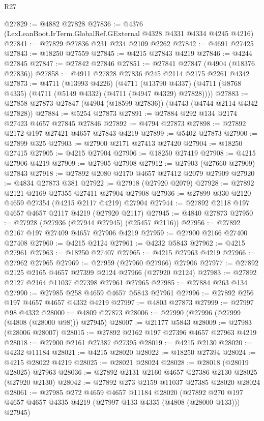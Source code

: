 \begin{lexlean}{R27}
\begin{coremodule}
@27829 := @4882 @27828
@27836 := @4376 (LexLeanBoot.IrTerm.GlobalRef.GExternal @4328 @4331 @4334 @4245 @4216)
@27841 := @27829 @27836 @231 @234 @2109 @2262
@27842 := @4691 @27425
@27843 := @18250 @27559
@27845 := @4215 @27843 @4219
@27846 := @4244 @27845
@27847 := @27842 @27846
@27851 := @27841 @27847 (@4904 (@18376 @27836))
@27858 := @4911 @27828 @27836 @245 @2114 @2175 @2261 @4342
@27873 := @4711
    (@13993 @4226)
    (@4711 (@13790 @4337) (@4711 (@8768 @4335) (@4711 (@5149 @4332) (@4711 (@4947 @4329) @27828))))
@27883 := @27858 @27873 @27847 (@4904 (@18599 @27836)) (@4743 (@4744 @2114 @4342 @27828))
@27884 := @5254 @27873
@27891 := @27884 @292 @134 @2174 @27423 @4657 @27845 @27846
@27892 := @4794 @27873
@27898 := @27892 @2172 @197 @27421 @4657 @27843 @4219
@27899 := @5402 @27873
@27900 := @27899 @325
@27903 := @27900 @2171 @27413 @27420
@27904 := @18250 @27415
@27905 := @4215 @27904
@27906 := @18250 @27419
@27908 := @4215 @27906 @4219
@27909 := @27905 @27908
@27912 := @27903 (@27660 @27909) @27843
@27918 := @27892 @2080 @2170 @4657 @27412 @2079 @27909
@27920 := @4834 @27873 @381
@27922 := @27918 (@27920 @2079)
@27928 := @27892 @2121 @2169 @27355 @27411 @27904 @27908
@27936 := @27899 @330 @2120 @4659 @27354 (@4215 @2117 @4219) @27904
@27944 := @27892 @2118 @197 @4657 @4657 @2117 @4219 (@27920 @2117)
@27945 := @4840 @27873
@27950 := @27928 (@27936 (@27944 @27945) (@25457 @2116))
@27956 := @27892 @2167 @197 @27409 @4657 @27906 @4219
@27959 := @27900 @2166 @27400 @27408
@27960 := @4215 @2124
@27961 := @4232 @5843
@27962 := @4215 @27961
@27963 := @18250 @27407
@27965 := @4215 @27963 @4219
@27966 := @27962 @27965
@27969 := @27959 (@27960 @27966) @27906
@27977 := @27892 @2125 @2165 @4657 @27399 @2124 @27966 (@27920 @2124)
@27983 := @27892 @2127 @2164 @11037 @27398 @27961 @27965
@27985 := @27884 @263 @134
@27990 := @27985 @258 @4659 @4657 @5843 @27961
@27996 := @27892 @256 @197 @4657 @4657 @4332 @4219
@27997 := @4803 @27873
@27999 := @27997 @98 @4332
@28000 := @4809 @27873
@28006 := @27990 (@27996 (@27999 (@4808 (@28000 @98))) @27945)
@28007 := @21177 @5843
@28009 := @27983 (@28006 @28007)
@28015 := @27892 @2162 @197 @27396 @4657 @27963 @4219
@28018 := @27900 @2161 @27387 @27395
@28019 := @4215 @2130
@28020 := @4232 @11184
@28021 := @4215 @28020
@28022 := @18250 @27394
@28024 := @4215 @28022 @4219
@28025 := @28021 @28024
@28028 := @28018 (@28019 @28025) @27963
@28036 := @27892 @2131 @2160 @4657 @27386 @2130 @28025 (@27920 @2130)
@28042 := @27892 @273 @2159 @11037 @27385 @28020 @28024
@28061 := @27985
    @272
    @4659
    @4657
    @11184
    @28020
    (@27892 @270 @197 @4657 @4657 @4335 @4219 (@27997 @133 @4335 (@4808 (@28000 @133))) @27945)

\end{coremodule}
\end{lexlean}
